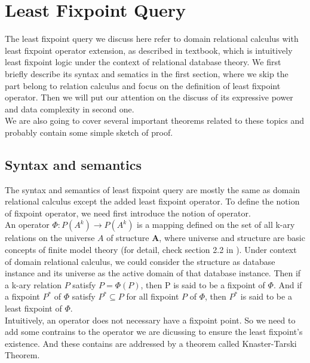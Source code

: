 \section{Least Fixpoint Query}
The least fixpoint query we discuss here refer to domain relational calculus with least fixpoint operator extension, as described in textbook\cite{Abiteboul1}, which is intuitively least fixpoint logic under the context of relational database theory. We first briefly describe its syntax and sematics in the first section, where we skip the part belong to relation calculus and focus on the definition of least fixpoint operator. Then we will put our attention on the discuss of its expressive power and data complexity in second one. \\
We are also going to cover several important theorems related to these topics and probably contain some simple sketch of proof.

\subsection{Syntax and semantics}
The syntax and semantics of least fixpoint query are mostly the same as domain relational calculus except the added least fixpoint operator. To define the notion of fixpoint operator, we need first introduce the notion of operator. \\
An operator $\Phi: \textit{P}(A^k)\rightarrow \textit{P}(A^k)$ is a mapping defined on the set of all k-ary relations on the universe $A$ of structure $\textbf{A}$, where universe and structure are basic concepts of finite model theory (for detail, check section 2.2 in \cite{kolaitis1}). Under context of domain relational calculus, we could consider the structure as database instance and its universe as the active domain of that database instance. Then if a k-ary relation $P$ satisfy $P=\Phi(P)$, then P is said to be a fixpoint of $\Phi$. And if a fixpoint $P^*$ of $\Phi$ satisfy $P^*\subseteq P$ for all fixpoint $P$ of $\Phi$, then $P^*$ is said to be a least fixpoint of $\Phi$.\\
Intuitively, an operator does not necessary have a fixpoint point. So we need to add some contrains to the operator we are dicussing to ensure the least fixpoint's existence. And these contains are addressed by a theorem called Knaster-Tarski Theorem\cite{Tarski}. \\


